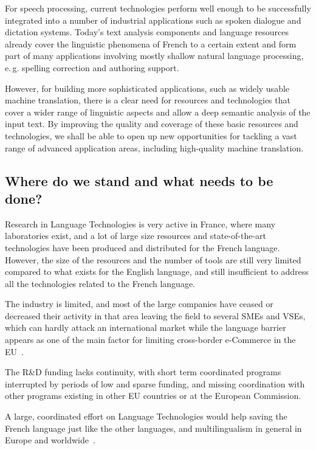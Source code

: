 \begin{multicols}{2}
For speech processing, current technologies perform well enough to be
successfully integrated into a number of industrial applications such
as spoken dialogue and dictation systems. Today’s text analysis
components and language resources already cover the linguistic
phenomena of French to a certain extent and form part of many
applications involving mostly shallow natural language processing,
e.\,g. spelling correction and authoring support.

However, for building more sophisticated applications, such as widely
usable machine translation, there is a clear need for resources and
technologies that cover a wider range of linguistic aspects and allow
a deep semantic analysis of the input text. By improving the quality
and coverage of these basic resources and technologies, we shall be
able to open up new opportunities for tackling a vast range of
advanced application areas, including high-quality machine
translation.

\subsection{Where do we stand and what needs to be done?}

Research in Language Technologies is very active in France, where many
laboratories exist, and a lot of large size resources and
state-of-the-art technologies have been produced and distributed for
the French language. However, the size of the resources and the number
of tools are still very limited compared to what exists for the
English language, and still insufficient to address all the
technologies related to the French language.

The industry is limited, and most of the large companies have ceased
or decreased their activity in that area leaving the field to several
SMEs and VSEs, which can hardly attack an international market while
the language barrier appears as one of the main factor for limiting
cross-border e-Commerce in the EU~\cite{euconclusion}.

The R\&D funding lacks continuity, with short term coordinated
programs interrupted by periods of low and sparse funding, and missing
coordination with other programs existing in other EU countries or at
the European Commission.

A large, coordinated effort on Language Technologies would help saving
the French language just like the other languages, and multilingualism
in general in Europe and worldwide~\cite{worldconclusion}.


\end{multicols}

